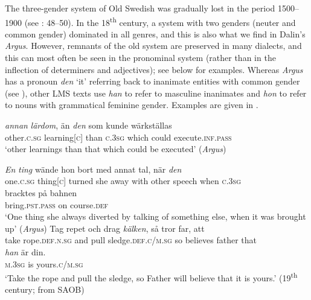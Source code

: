\documentclass[output=paper]{langscibook}
\begin{document}
The three-gender system of Old Swedish was gradually lost in the period 1500–1900 (see \citealt{Davidson1990}: 48–50). In the 18\textsuperscript{th} century, a system with two genders (neuter and common gender) dominated in all genres, and this is also what we find in Dalin’s \textit{Argus}. However, remnants of the old system are preserved in many dialects, and this can most often be seen in the pronominal system (rather than in the inflection of determiners and adjectives); see  below for examples. Whereas \textit{Argus} has a pronoun \textit{den} ‘it’ referring back to inanimate entities with common gender (see ), other LMS texts use \textit{han} to refer to masculine inanimates and \textit{hon} to refer to nouns with grammatical feminine gender. Examples are given in .


\ea\label{ex:intro:37}
\ea\label{ex:intro:37a}
\gll  \textit{annan} \textit{lärdom},     än \textit{den} som   kunde   wärkställas \\
  other.\textsc{c.sg}  learning[\textsc{c}] than   \textsc{c.3sg}   which   could   execute\textsc{.inf.pass}\\
    \glt `other learnings than that which could be executed’ (\textit{Argus})

\ex\label{ex:intro:37b}
\gll \textit{En} \textit{ting} wände   hon   bort  med annat   tal,     när \textit{den}\\
 one.\textsc{c.sg}   thing[\textsc{c}] turned   she   away   with other   speech   when   \textsc{c.3sg}\\

 \gll bracktes       på   bahnen\\
    bring.\textsc{pst.pass}   on   course.\textsc{def}\\

\glt ‘One thing she always diverted by talking of something else, when it was brought up’ (\textit{Argus})
\z
\ex \label{ex:intro:38}
\ea\label{ex:intro:38a}
\gll  Tag   repet         och drag \textit{kälken},             så tror       far,      att \\
take   rope\textsc{.def.n.sg}  and pull    sledge.\textsc{def.c/m.sg}   so believes father   that \\

\gll \textit{han}     är din.\\
    \textsc{m.3sg}  is  yours\textsc{.c/m.sg}  \\
    \glt `Take the rope and pull the sledge, so Father will believe that it is yours.’ (19\textsuperscript{th} century; from SAOB)
\end{document}
